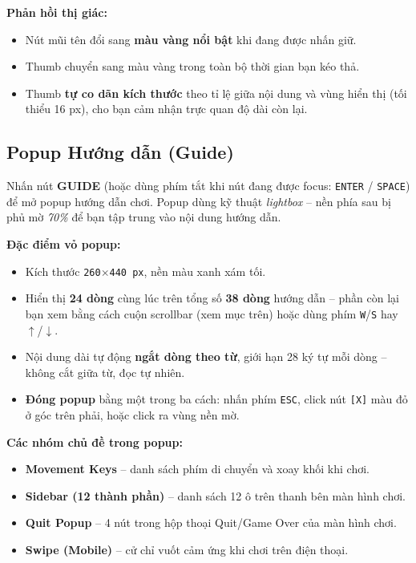 \documentclass[12pt,a4paper]{article}
\begin{document}
\vspace{4pt}
\noindent\textbf{Phản hồi thị giác:}
\begin{itemize}
    \item Nút mũi tên đổi sang \textbf{màu vàng nổi bật} khi đang được nhấn giữ.
    \item Thumb chuyển sang màu vàng trong toàn bộ thời gian bạn kéo thả.
    \item Thumb \textbf{tự co dãn kích thước} theo tỉ lệ giữa nội dung và vùng hiển thị (tối thiểu 16 px), cho bạn cảm nhận trực quan độ dài còn lại.
\end{itemize}

\subsection{Popup Hướng dẫn (Guide)}
Nhấn nút \textbf{GUIDE} (hoặc dùng phím tắt khi nút đang được focus: \texttt{ENTER} / \texttt{SPACE}) để mở popup hướng dẫn chơi. Popup dùng kỹ thuật \textit{lightbox} -- nền phía sau bị phủ mờ \emph{70\%} để bạn tập trung vào nội dung hướng dẫn.

\vspace{4pt}
\noindent\textbf{Đặc điểm vỏ popup:}
\begin{itemize}
    \item Kích thước \texttt{260$\times$440 px}, nền màu xanh xám tối.
    \item Hiển thị \textbf{24 dòng} cùng lúc trên tổng số \textbf{38 dòng} hướng dẫn -- phần còn lại bạn xem bằng cách cuộn scrollbar (xem mục trên) hoặc dùng phím \texttt{W}/\texttt{S} hay \texttt{$\uparrow$}/\texttt{$\downarrow$}.
    \item Nội dung dài tự động \textbf{ngắt dòng theo từ}, giới hạn 28 ký tự mỗi dòng -- không cắt giữa từ, đọc tự nhiên.
    \item \textbf{Đóng popup} bằng một trong ba cách: nhấn phím \texttt{ESC}, click nút \texttt{[X]} màu đỏ ở góc trên phải, hoặc click ra vùng nền mờ.
\end{itemize}

\noindent\textbf{Các nhóm chủ đề trong popup:}
\begin{itemize}
    \item \textbf{Movement Keys} -- danh sách phím di chuyển và xoay khối khi chơi.
    \item \textbf{Sidebar (12 thành phần)} -- danh sách 12 ô trên thanh bên màn hình chơi.
    \item \textbf{Quit Popup} -- 4 nút trong hộp thoại Quit/Game Over của màn hình chơi.
    \item \textbf{Swipe (Mobile)} -- cử chỉ vuốt cảm ứng khi chơi trên điện thoại.
\end{itemize}
\end{document}
